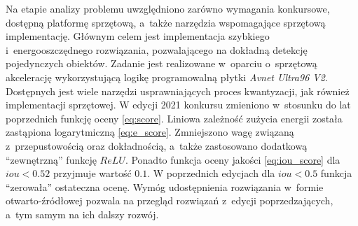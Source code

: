 Na etapie analizy problemu uwzględniono zarówno wymagania konkursowe, dostępną platformę sprzętową, a~także  narzędzia wspomagające sprzętową implementację.
Głównym celem jest implementacja szybkiego i~energooszczędnego rozwiązania, pozwalającego na dokładną detekcję pojedynczych obiektów. 
Zadanie jest realizowane w~oparciu o~sprzętową akcelerację wykorzystującą logikę programowalną płytki \emph{Avnet Ultra96 V2}.
Dostępnych jest wiele narzędzi usprawniających proces kwantyzacji, jak również implementacji sprzętowej.
W edycji 2021 konkursu zmieniono w~stosunku do lat poprzednich funkcję oceny \eqref{eq:score}. Liniowa zależność zużycia energii została zastąpiona logarytmiczną \eqref{eq:e_score}. 
Zmniejszono wagę związaną z~przepustowością oraz dokładnością, a~także zastosowano dodatkową ``zewnętrzną'' funkcję $ReLU$. 
Ponadto funkcja oceny jakości \eqref{eq:iou_score} dla $iou < 0.52$ przyjmuje wartość $0.1$. 
W poprzednich edycjach dla $iou < 0.5$ funkcja ``zerowała'' ostateczna ocenę.   
Wymóg udostępnienia rozwiązania w~formie otwarto-źródłowej pozwala na przegląd rozwiązań z~edycji poprzedzających, a~tym samym na ich dalszy rozwój.






    

